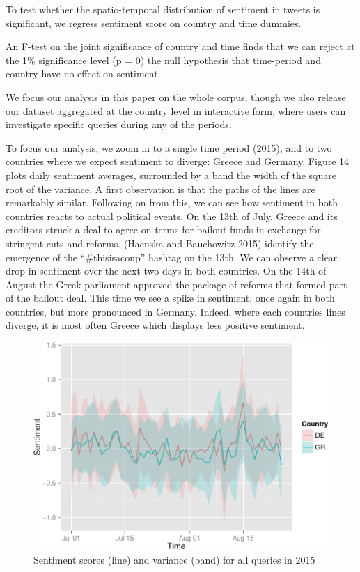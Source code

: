 \documentclass[]{article}
\begin{document}
To test whether the spatio-temporal distribution of sentiment in tweets
is significant, we regress sentiment score on country and time dummies.

An F-test on the joint significance of country and time finds that we
can reject at the 1\% significance level (p = 0) the null hypothesis
that time-period and country have no effect on sentiment.

We focus our analysis in this paper on the whole corpus, though we also
release our dataset aggregated at the country level in
\href{http://mcallaghan.github.io/col_res_proj/}{interactive form},
where users can investigate specific queries during any of the periods.

To focus our analysis, we zoom in to a single time period (2015), and to
two countries where we expect sentiment to diverge: Greece and Germany.
Figure 14 plots daily sentiment averages, surrounded by a band the width
of the square root of the variance. A first observation is that the
paths of the lines are remarkably similar. Following on from this, we
can see how sentiment in both countries reacts to actual political
events. On the 13th of July, Greece and its creditors struck a deal to
agree on terms for bailout funds in exchange for stringent cuts and
reforms. (Haenska and Bauchowitz 2015) identify the emergence of the
``\#thisisacoup'' hashtag on the 13th. We can observe a clear drop in
sentiment over the next two days in both countries. On the 14th of
August the Greek parliament approved the package of reforms that formed
part of the bailout deal. This time we see a spike in sentiment, once
again in both countries, but more pronounced in Germany. Indeed, where
each countries lines diverge, it is most often Greece which displays
less positive sentiment.

\begin{figure}[htbp]
\centering
\includegraphics{fin_paper_files/figure-latex/unnamed-chunk-17-1.pdf}
\caption{Sentiment scores (line) and variance (band) for all queries in
2015}
\end{figure}
\end{document}
